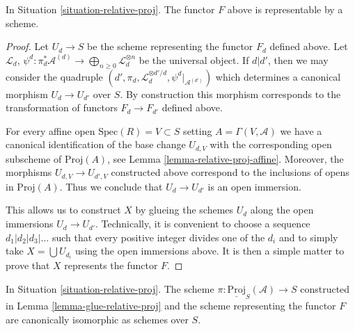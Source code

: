 \begin{lemma}
\label{lemma-relative-proj}
In Situation \ref{situation-relative-proj}.
The functor $F$ above is representable by a scheme.
\end{lemma}

\begin{proof}
Let $U_d \to S$ be the scheme representing the functor $F_d$
defined above. Let $\mathcal{L}_d$,
$\psi^d : \pi_d^*\mathcal{A}^{(d)} \to
\bigoplus_{n \geq 0} \mathcal{L}_d^{\otimes n}$ be the universal object.
If $d | d'$, then we may consider the quadruple
$(d', \pi_d, \mathcal{L}_d^{\otimes d'/d}, \psi^d|_{\mathcal{A}^{(d')}})$
which determines a canonical morphism $U_d \to U_{d'}$ over $S$.
By construction this morphism corresponds to the transformation
of functors $F_d \to F_{d'}$ defined above.

\medskip\noindent
For every affine open $\text{Spec}(R) = V \subset S$
setting $A = \Gamma(V, \mathcal{A})$ we have a canonical
identification of the base change $U_{d, V}$ with the corresponding open
subscheme of $\text{Proj}(A)$, see Lemma \ref{lemma-relative-proj-affine}.
Moreover, the morphisms $U_{d, V} \to U_{d', V}$ constructed above
correspond to the inclusions of opens in $\text{Proj}(A)$.
Thus we conclude that $U_d \to U_{d'}$ is an open immersion.

\medskip\noindent
This allows us to construct $X$
by glueing the schemes $U_d$ along the open immersions $U_d \to U_{d'}$.
Technically, it is convenient to choose a sequence
$d_1 | d_2 | d_3 | \ldots$ such that every positive integer
divides one of the $d_i$ and to simply take
$X = \bigcup U_{d_i}$ using the open immersions above.
It is then a simple matter to prove that $X$ represents the
functor $F$.
\end{proof}

\begin{lemma}
\label{lemma-glueing-gives-functor-proj}
In Situation \ref{situation-relative-proj}.
The scheme $\pi : \underline{\text{Proj}}_S(\mathcal{A}) \to S$
constructed in Lemma \ref{lemma-glue-relative-proj}
and the scheme representing the functor $F$
are canonically isomorphic as schemes over $S$.
\end{lemma}


